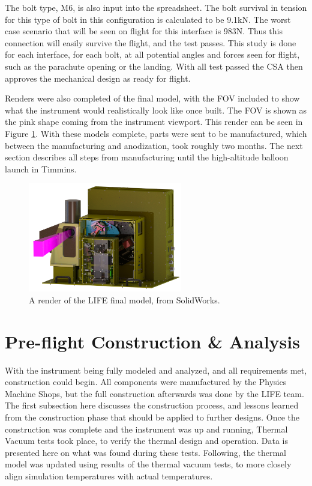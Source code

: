 The bolt type, M6, is also input into the spreadsheet. The bolt survival in tension for this type of bolt in this configuration is calculated to be 9.1kN. The worst case scenario that will be seen on flight for this interface is 983N. Thus this connection will easily survive the flight, and the test passes. This study is done for each interface, for each bolt, at all potential angles and forces seen for flight, such as the parachute opening or the landing. With all test passed the CSA then approves the mechanical design as ready for flight.

Renders were also completed of the final model, with the FOV included to show what the instrument would realistically look like once built. The FOV is shown as the pink shape coming from the instrument viewport. This render can be seen in Figure \ref{fig:LIFE_FINAL_RENDER}. With these models complete, parts were sent to be manufactured, which between the manufacturing and anodization, took roughly two months. The next section describes all steps from manufacturing until the high-altitude balloon launch in Timmins.

\begin{figure}
    \centering
    \includegraphics[width=0.6\textwidth]{chap3_images/LIFE_V5_final_images/side_view_bbebox.png}
    \caption{A render of the LIFE final model, from SolidWorks.}
    \label{fig:LIFE_FINAL_RENDER}
\end{figure}

\section{Pre-flight Construction \& Analysis}\label{preflight_const_analysis}
With the instrument being fully modeled and analyzed, and all requirements met, construction could begin. All components were manufactured by the Physics Machine Shops, but the full construction afterwards was done by the LIFE team. The first subsection here discusses the construction process, and lessons learned from the construction phase that should be applied to further designs. Once the construction was complete and the instrument was up and running, Thermal Vacuum tests took place, to verify the thermal design and operation. Data is presented here on what was found during these tests. Following, the thermal model was updated using results of the thermal vacuum tests, to more closely align simulation temperatures with actual temperatures. 

